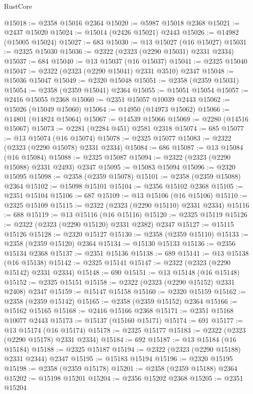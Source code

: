 \begin{lexlean}{RustCore}
\begin{coremodule}
@15018 := @2358 @15016 @2364
@15020 := @5987 @15018 @2368
@15021 := @2437 @15020
@15024 := @15014 (@2426 @15021) @2443
@15026 := @14982 (@15005 @15024)
@15027 := 683
@15030 := @13 @15027 (@16 @15027)
@15031 := @2325 @15030
@15036 := @2322 (@2323 (@2290 @15031) @2331 @2334)
@15037 := 684
@15040 := @13 @15037 (@16 @15037)
@15041 := @2325 @15040
@15047 := @2322 (@2323 (@2290 @15041) @2331 @3510) @2347
@15048 := @15036 @15047
@15049 := @2320 @15048
@15051 := @2358 (@2359 @15031)
@15054 := @2358 (@2359 @15041) @2364
@15055 := @15051 @15054
@15057 := @2416 @15055 @2368
@15060 := @2351 @15057 @10039 @2443
@15062 := @15026 (@15049 @15060)
@15064 := @14950 (@14973 @15062)
@15066 := @14801 (@14824 @15064)
@15067 := @14539 @15066
@15069 := @2280 (@14516 @15067)
@15073 := @2281 (@2284 @451) @2581 @2318
@15074 := 685
@15077 := @13 @15074 (@16 @15074)
@15078 := @2325 @15077
@15083 := @2322 (@2323 (@2290 @15078) @2331 @2334)
@15084 := 686
@15087 := @13 @15084 (@16 @15084)
@15088 := @2325 @15087
@15094 := @2322 (@2323 (@2290 @15088) @2331 @2493) @2347
@15095 := @15083 @15094
@15096 := @2320 @15095
@15098 := @2358 (@2359 @15078)
@15101 := @2358 (@2359 @15088) @2364
@15102 := @15098 @15101
@15104 := @2356 @15102 @2368
@15105 := @2351 @15104
@15106 := 687
@15109 := @13 @15106 (@16 @15106)
@15110 := @2325 @15109
@15115 := @2322 (@2323 (@2290 @15110) @2331 @2334)
@15116 := 688
@15119 := @13 @15116 (@16 @15116)
@15120 := @2325 @15119
@15126 := @2322 (@2323 (@2290 @15120) @2331 @2382) @2347
@15127 := @15115 @15126
@15128 := @2320 @15127
@15130 := @2358 (@2359 @15110)
@15133 := @2358 (@2359 @15120) @2364
@15134 := @15130 @15133
@15136 := @2356 @15134 @2368
@15137 := @2351 @15136
@15138 := 689
@15141 := @13 @15138 (@16 @15138)
@15142 := @2325 @15141
@15147 := @2322 (@2323 (@2290 @15142) @2331 @2334)
@15148 := 690
@15151 := @13 @15148 (@16 @15148)
@15152 := @2325 @15151
@15158 := @2322 (@2323 (@2290 @15152) @2331 @2408) @2347
@15159 := @15147 @15158
@15160 := @2320 @15159
@15162 := @2358 (@2359 @15142)
@15165 := @2358 (@2359 @15152) @2364
@15166 := @15162 @15165
@15168 := @2416 @15166 @2368
@15171 := @2351 @15168 @10077 @2443
@15173 := @15137 (@15160 @15171)
@15174 := 691
@15177 := @13 @15174 (@16 @15174)
@15178 := @2325 @15177
@15183 := @2322 (@2323 (@2290 @15178) @2331 @2334)
@15184 := 692
@15187 := @13 @15184 (@16 @15184)
@15188 := @2325 @15187
@15194 := @2322 (@2323 (@2290 @15188) @2331 @2344) @2347
@15195 := @15183 @15194
@15196 := @2320 @15195
@15198 := @2358 (@2359 @15178)
@15201 := @2358 (@2359 @15188) @2364
@15202 := @15198 @15201
@15204 := @2356 @15202 @2368
@15205 := @2351 @15204

\end{coremodule}
\end{lexlean}
